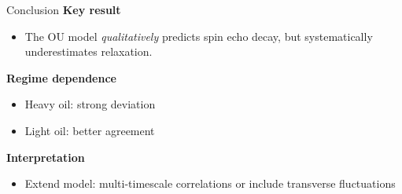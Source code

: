 \documentclass[aspectratio=169,xcolor=dvipsnames]{beamer}
\begin{document}

\begin{frame}{Conclusion}
    \textbf{Key result}
    \begin{itemize}
        \item The OU model \textit{qualitatively} predicts spin echo decay, but systematically underestimates relaxation.
    \end{itemize}
    \textbf{Regime dependence}
    \begin{itemize}
        \item Heavy oil: strong deviation
        \item Light oil: better agreement
    \end{itemize}
    \textbf{Interpretation}
    \begin{itemize}
        \item Extend model: multi-timescale correlations or include transverse fluctuations
    \end{itemize}
\end{frame}
\end{document}
